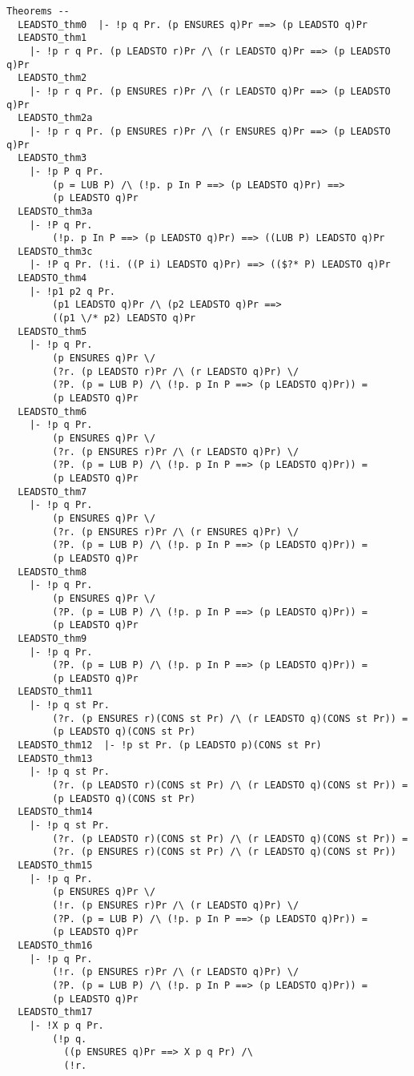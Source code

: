 {\begin{verbatim}
Theorems --
  LEADSTO_thm0  |- !p q Pr. (p ENSURES q)Pr ==> (p LEADSTO q)Pr
  LEADSTO_thm1
    |- !p r q Pr. (p LEADSTO r)Pr /\ (r LEADSTO q)Pr ==> (p LEADSTO q)Pr
  LEADSTO_thm2
    |- !p r q Pr. (p ENSURES r)Pr /\ (r LEADSTO q)Pr ==> (p LEADSTO q)Pr
  LEADSTO_thm2a
    |- !p r q Pr. (p ENSURES r)Pr /\ (r ENSURES q)Pr ==> (p LEADSTO q)Pr
  LEADSTO_thm3
    |- !p P q Pr.
        (p = LUB P) /\ (!p. p In P ==> (p LEADSTO q)Pr) ==>
        (p LEADSTO q)Pr
  LEADSTO_thm3a
    |- !P q Pr.
        (!p. p In P ==> (p LEADSTO q)Pr) ==> ((LUB P) LEADSTO q)Pr
  LEADSTO_thm3c
    |- !P q Pr. (!i. ((P i) LEADSTO q)Pr) ==> (($?* P) LEADSTO q)Pr
  LEADSTO_thm4
    |- !p1 p2 q Pr.
        (p1 LEADSTO q)Pr /\ (p2 LEADSTO q)Pr ==>
        ((p1 \/* p2) LEADSTO q)Pr
  LEADSTO_thm5
    |- !p q Pr.
        (p ENSURES q)Pr \/
        (?r. (p LEADSTO r)Pr /\ (r LEADSTO q)Pr) \/
        (?P. (p = LUB P) /\ (!p. p In P ==> (p LEADSTO q)Pr)) =
        (p LEADSTO q)Pr
  LEADSTO_thm6
    |- !p q Pr.
        (p ENSURES q)Pr \/
        (?r. (p ENSURES r)Pr /\ (r LEADSTO q)Pr) \/
        (?P. (p = LUB P) /\ (!p. p In P ==> (p LEADSTO q)Pr)) =
        (p LEADSTO q)Pr
  LEADSTO_thm7
    |- !p q Pr.
        (p ENSURES q)Pr \/
        (?r. (p ENSURES r)Pr /\ (r ENSURES q)Pr) \/
        (?P. (p = LUB P) /\ (!p. p In P ==> (p LEADSTO q)Pr)) =
        (p LEADSTO q)Pr
  LEADSTO_thm8
    |- !p q Pr.
        (p ENSURES q)Pr \/
        (?P. (p = LUB P) /\ (!p. p In P ==> (p LEADSTO q)Pr)) =
        (p LEADSTO q)Pr
  LEADSTO_thm9
    |- !p q Pr.
        (?P. (p = LUB P) /\ (!p. p In P ==> (p LEADSTO q)Pr)) =
        (p LEADSTO q)Pr
  LEADSTO_thm11
    |- !p q st Pr.
        (?r. (p ENSURES r)(CONS st Pr) /\ (r LEADSTO q)(CONS st Pr)) =
        (p LEADSTO q)(CONS st Pr)
  LEADSTO_thm12  |- !p st Pr. (p LEADSTO p)(CONS st Pr)
  LEADSTO_thm13
    |- !p q st Pr.
        (?r. (p LEADSTO r)(CONS st Pr) /\ (r LEADSTO q)(CONS st Pr)) =
        (p LEADSTO q)(CONS st Pr)
  LEADSTO_thm14
    |- !p q st Pr.
        (?r. (p LEADSTO r)(CONS st Pr) /\ (r LEADSTO q)(CONS st Pr)) =
        (?r. (p ENSURES r)(CONS st Pr) /\ (r LEADSTO q)(CONS st Pr))
  LEADSTO_thm15
    |- !p q Pr.
        (p ENSURES q)Pr \/
        (!r. (p ENSURES r)Pr /\ (r LEADSTO q)Pr) \/
        (?P. (p = LUB P) /\ (!p. p In P ==> (p LEADSTO q)Pr)) =
        (p LEADSTO q)Pr
  LEADSTO_thm16
    |- !p q Pr.
        (!r. (p ENSURES r)Pr /\ (r LEADSTO q)Pr) \/
        (?P. (p = LUB P) /\ (!p. p In P ==> (p LEADSTO q)Pr)) =
        (p LEADSTO q)Pr
  LEADSTO_thm17
    |- !X p q Pr.
        (!p q.
          ((p ENSURES q)Pr ==> X p q Pr) /\
          (!r.

\end{verbatim}}
